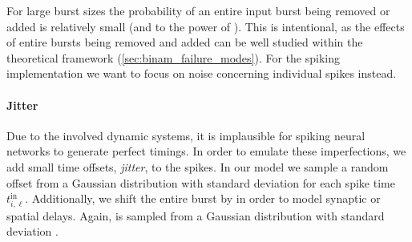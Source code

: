For large burst sizes \burstSizeIn the probability of an entire input burst being removed or added is relatively small (\pFn and \pFp to the power of \burstSizeIn). This is intentional, as the effects of entire bursts being removed and added can be well studied within the theoretical \BiNAM framework (\cref{sec:binam_failure_modes}). For the spiking implementation we want to focus on noise concerning individual spikes instead.

\paragraph{Jitter}
Due to the involved dynamic systems, it is implausible for spiking neural networks to generate perfect timings. In order to emulate these imperfections, we add small time offsets, \emph{jitter}, to the spikes.
In our model we sample a random offset from a Gaussian distribution with standard deviation \jitter for each spike time $t^{\mathrm{in}}_{i, \ell}$. Additionally, we shift the entire burst by \jitterMeanOffs in order to model synaptic or spatial delays. Again, \jitterMeanOffs is sampled from a Gaussian distribution with standard deviation \jitterOffs.


